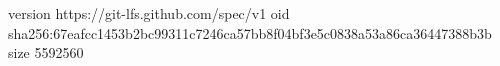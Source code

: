 version https://git-lfs.github.com/spec/v1
oid sha256:67eafcc1453b2bc99311c7246ca57bb8f04bf3e5c0838a53a86ca36447388b3b
size 5592560
